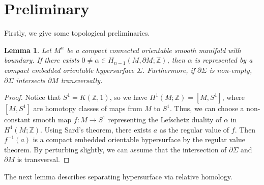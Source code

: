 \documentclass[11pt,letterpaper]{amsart}
\newtheorem{lemma}[theorem]{Lemma}
\theoremstyle{definition}
\theoremstyle{remark}
\numberwithin{equation}{section}
\begin{document}
\section{Preliminary}\label{section2}

Firstly, we give some topological preliminaries. 
\begin{lemma}\label{represented}
    Let $M^{n}$ be a compact connected orientable smooth manifold with boundary. If there exists $0\neq \alpha\in H_{n-1}(M,\partial M;\mathbb{Z})$, then $\alpha$ is represented by a compact embedded orientable hypersurface $\Sigma$. Furthermore, if $\partial \Sigma$ is non-empty, $\partial\Sigma$ intersects $\partial M$ transversally.
\end{lemma}
\begin{proof}
    Notice that $S^{1}=K(\mathbb{Z}, 1)$, so we have $H^{1}(M;\mathbb{Z}) = [M, S^1]$, where $[M, S^1]$ are
    homotopy classes of maps from $M$ to $S^1$. Thus, we can choose a non-constant smooth
    map $f: M \rightarrow S^1$ representing the Lefschetz duality of $\alpha$ in $H^1(M;\mathbb{Z})$. Using Sard’s theorem, there exists $a$ as the regular value of $f$. Then $f^{-1}(a)$ is a compact embedded orientable hypersurface by the regular value theorem. By perturbing slightly, we can assume that the intersection of $\partial \Sigma$ and $\partial M$ is transversal.
\end{proof}
The next lemma describes separating hypersurface via relative homology.
\end{document}
